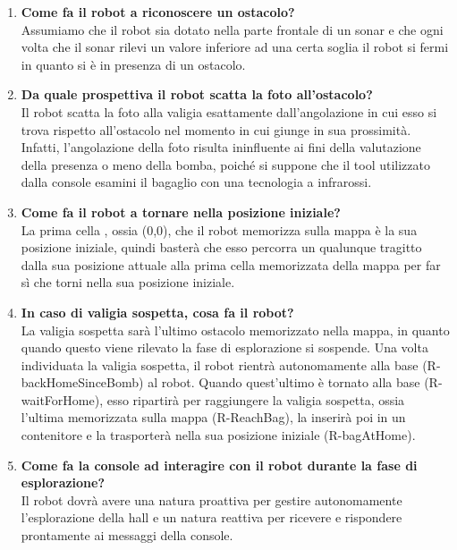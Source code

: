 \begin{enumerate}
    \item \textbf{Come fa il robot a riconoscere un ostacolo?}\\
    Assumiamo che il robot sia dotato nella parte frontale di un sonar e che ogni volta che il sonar rilevi un valore inferiore ad una certa soglia il robot si fermi in quanto si è in presenza di un ostacolo. 
    
    \item \textbf{Da quale prospettiva il robot scatta la foto all'ostacolo?}\\
    Il robot scatta la foto alla valigia esattamente dall'angolazione in cui esso si trova rispetto all'ostacolo nel momento in cui giunge in sua prossimità. Infatti, l'angolazione della foto risulta ininfluente ai fini della valutazione della presenza o meno della bomba, poiché si suppone che il tool utilizzato dalla console esamini il bagaglio con una tecnologia a infrarossi.
    
    \item \textbf{Come fa il robot a tornare nella posizione iniziale?}\\
    La prima cella , ossia (0,0), che il robot memorizza sulla mappa è la sua posizione iniziale, quindi basterà che esso percorra un qualunque tragitto dalla sua posizione attuale alla prima cella memorizzata della mappa per far sì che torni nella sua posizione iniziale.
    
    \item \textbf{In caso di valigia sospetta, cosa fa il robot?}\\
    La valigia sospetta sarà l'ultimo ostacolo memorizzato nella mappa, in quanto quando questo viene rilevato la fase di esplorazione si sospende. 
    Una volta individuata la valigia sospetta, il robot rientrà autonomamente alla base (R-backHomeSinceBomb) al robot. Quando quest'ultimo è tornato alla base (R-waitForHome), esso ripartirà per raggiungere la valigia sospetta, ossia l'ultima memorizzata sulla mappa (R-ReachBag), la inserirà poi in un contenitore e la trasporterà nella sua posizione iniziale (R-bagAtHome). 
    
    \item \textbf{Come fa la console ad interagire con il robot durante la fase di esplorazione?}\\
    Il robot dovrà avere una natura proattiva per gestire autonomamente l'esplorazione della hall e un natura reattiva per ricevere e rispondere prontamente ai messaggi della console.
    
\end{enumerate}

